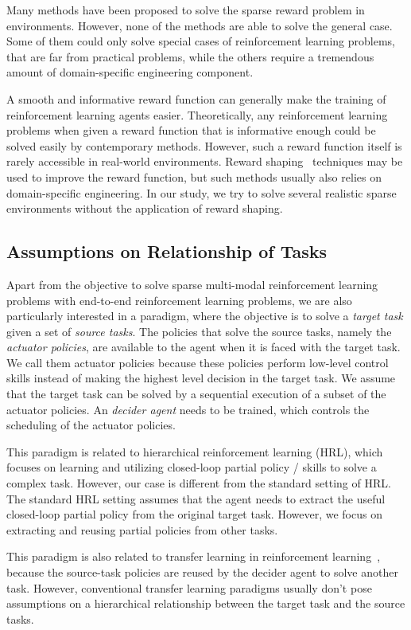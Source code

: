 Many methods have been proposed to solve the sparse reward problem in environments. However, none of the methods are able to solve the general case. Some of them could only solve special cases of reinforcement learning problems, that are far from practical problems, while the others require a tremendous amount of domain-specific engineering component.

A smooth and informative reward function can generally make the training of reinforcement learning agents easier. Theoretically, any reinforcement learning problems when given a reward function that is informative enough could be solved easily by contemporary methods. However, such a reward function itself is rarely accessible in real-world environments. Reward shaping~\cite{ng1999policy} techniques may be used to improve the reward function, but such methods usually also relies on domain-specific engineering. In our study, we try to solve several realistic sparse environments without the application of reward shaping.


\subsection{Assumptions on Relationship of Tasks}
Apart from the objective to solve sparse multi-modal reinforcement learning problems with end-to-end reinforcement learning problems, we are also particularly interested in a paradigm, where the objective is to solve a \textit{target task } given a set of \textit{source tasks}. The policies that solve the source tasks, namely the \textit{actuator policies}, are available to the agent when it is faced with the target task. We call them actuator policies because these policies perform low-level control skills instead of making the highest level decision in the target task. We assume that the target task can be solved by a sequential execution of a subset of the actuator policies. An \textit{decider agent} needs to be trained, which controls the scheduling of the actuator policies.

This paradigm is related to hierarchical reinforcement learning (HRL), which focuses on learning and utilizing closed-loop partial policy / skills to solve a complex task. However, our case is different from the standard setting of HRL. The standard HRL setting assumes that the agent needs to extract the useful closed-loop partial policy from the original target task. However, we focus on extracting and reusing partial policies from other tasks.

This paradigm is also related to transfer learning in reinforcement learning~\cite{taylor2009transfer}, because the source-task policies are reused by the decider agent to solve another task. However, conventional transfer learning paradigms usually don't pose assumptions on a hierarchical relationship between the target task and the source tasks.

